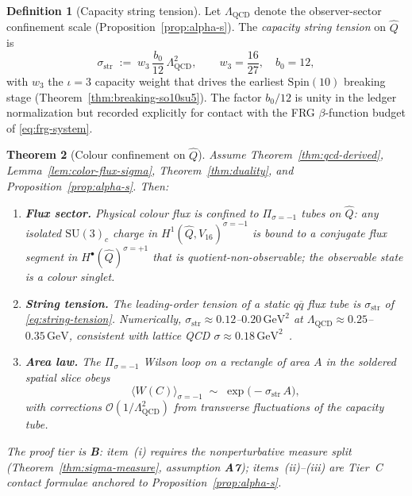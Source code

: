 \documentclass[11pt]{article}
\theoremstyle{plain}
\newtheorem{theorem}{Theorem}[section]
\theoremstyle{definition}
\newtheorem{definition}[theorem]{Definition}
\theoremstyle{remark}
\numberwithin{equation}{section}
\newcommand{\Spin}{\mathrm{Spin}}
\begin{document}
\begin{definition}[Capacity string tension]\label{def:string-tension}
Let $\Lambda_{\mathrm{QCD}}$ denote the observer-sector confinement scale
(Proposition~\ref{prop:alpha-s}). The \emph{capacity string tension} on
$\hat Q$ is
\begin{equation}\label{eq:string-tension}
  \sigma_{\mathrm{str}}
  \;:=\;
  w_3\,\frac{b_0}{12}\,\Lambda_{\mathrm{QCD}}^{2},
  \qquad
  w_3=\frac{16}{27},\quad b_0=12,
\end{equation}
with $w_3$ the $\iota=3$ capacity weight that drives the earliest
$\Spin(10)$ breaking stage (Theorem~\ref{thm:breaking-so10su5}). The factor
$b_0/12$ is unity in the ledger normalization but recorded explicitly for
contact with the FRG $\beta$-function budget of \eqref{eq:frg-system}.
\end{definition}

\begin{theorem}[Colour confinement on $\hat Q$]
\label{thm:confinement}
Assume Theorem~\ref{thm:qcd-derived}, Lemma~\ref{lem:color-flux-sigma},
Theorem~\ref{thm:duality}, and Proposition~\ref{prop:alpha-s}. Then:
\begin{enumerate}[label=(\roman*),leftmargin=*]
  \item \textbf{Flux sector.} Physical colour flux is confined to
    $\Pi_{\sigma=-1}$ tubes on $\hat Q$: any isolated $\mathrm{SU}(3)_c$
    charge in $H^1(\hat Q,V_{16})^{\sigma=-1}$ is bound to a conjugate flux
    segment in $H^\bullet(\hat Q)^{\sigma=+1}$ that is
    quotient-non-observable; the observable state is a colour singlet.
  \item \textbf{String tension.} The leading-order tension of a static
    $q\overline{q}$ flux tube is $\sigma_{\mathrm{str}}$ of
    \eqref{eq:string-tension}. Numerically,
    $\sigma_{\mathrm{str}}\approx 0.12$--$0.20\,\mathrm{GeV}^2$ at
    $\Lambda_{\mathrm{QCD}}\approx 0.25$--$0.35\,\mathrm{GeV}$, consistent
    with lattice QCD $\sigma\approx 0.18\,\mathrm{GeV}^2$~\cite{PDG2025}.
  \item \textbf{Area law.} The $\Pi_{\sigma=-1}$ Wilson loop on a
    rectangle of area $A$ in the soldered spatial slice obeys
    \begin{equation}\label{eq:area-law}
      \langle W(C)\rangle_{\sigma=-1}
      \;\sim\;
      \exp\!\bigl(-\sigma_{\mathrm{str}}\,A\bigr),
    \end{equation}
    with corrections $\mathcal{O}(1/\Lambda_{\mathrm{QCD}}^2)$ from
    transverse fluctuations of the capacity tube.
\end{enumerate}
The proof tier is \textbf{B}: item~(i) requires the nonperturbative measure
split (Theorem~\ref{thm:sigma-measure}, assumption \textbf{A7}); items~(ii)--(iii)
are Tier~C contact formulae anchored to Proposition~\ref{prop:alpha-s}.
\end{theorem}
\end{document}
